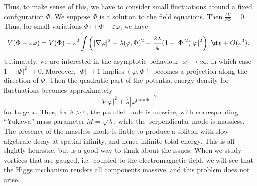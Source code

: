 \documentclass[a4paper]{article}
\begin{document}
Thus, to make sense of this, we have to consider small fluctuations around a fixed configuration $\Phi$. We suppose $\Phi$ is a solution to the field equations. Then $\frac{\delta V}{\delta \Phi} = 0$. Thus, for small variations $\Phi \mapsto \Phi + \varepsilon \varphi$, we have
\[
  V(\Phi + \varepsilon \varphi) = V(\Phi) + \varepsilon^2 \int \left(|\nabla \varphi|^2 + \lambda (\varphi, \Phi)^2 - \frac{2\lambda}{4}(1 - |\Phi|^2)|\varphi|^2\right) \;\d x + O(\varepsilon^3).
\]
Ultimately, we are interested in the asymptotic behaviour $|x| \to \infty$, in which case $1 - |\Phi|^2 \to 0$. Moreover, $|\Phi| \to 1$ implies $(\varphi, \Phi)$ becomes a projection along the direction of $\Phi$. Then the quadratic part of the potential energy density for fluctuations becomes approximately
\[
  |\nabla \varphi|^2 + \lambda |\varphi^{\mathrm{parallel}}|^2
\]
for large $x$. Thus, for $\lambda > 0$, the parallel mode is massive, with corresponding ``Yukawa'' mass parameter $M = \sqrt{\lambda}$, while the perpendicular mode is massless. The presence of the massless mode is liable to produce a soliton with slow algebraic decay at spatial infinity, and hence infinite total energy. This is all slightly heuristic, but is a good way to think about the issues. When we study vortices that are gauged, i.e.\ coupled to the electromagnetic field, we will see that the Higgs mechanism renders all components massive, and this problem does not arise.
\end{document}
